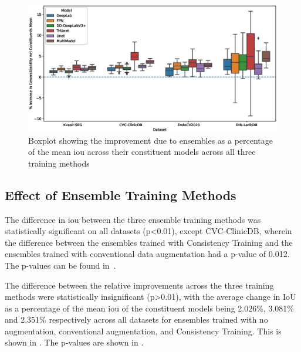 \begin{figure}[htb]
    \centering
    \includegraphics[width=\linewidth]{illustrations/improvements_due_to_ensembles.eps}
    \caption[Improvements due to Ensembles]{Boxplot showing the improvement due to ensembles as a percentage of the mean \gls{iou} across their constituent models across all three training methods}
    \label{fig:ensemble_improvements}
\end{figure}

 
\subsection{Effect of Ensemble Training Methods}\label{ensemble_training_methods}

The difference in \gls{iou} between the three ensemble training methods was statistically significant on all datasets (p<0.01), except CVC-ClinicDB, wherein the difference between the ensembles trained with Consistency Training and the ensembles trained with conventional data augmentation had a p-value of 0.012. The p-values can be found in~. 

The difference between the relative improvements across the three training methods were statistically insignificant (p>0.01), with the average change in IoU as a percentage of the mean \gls{iou} of the constituent models being 2.026\%, 3.081\% and 2.351\% respectively across all datasets for ensembles trained with no augmentation, conventional augmentation, and Consistency Training.  This is shown in . The p-values are shown in . 

